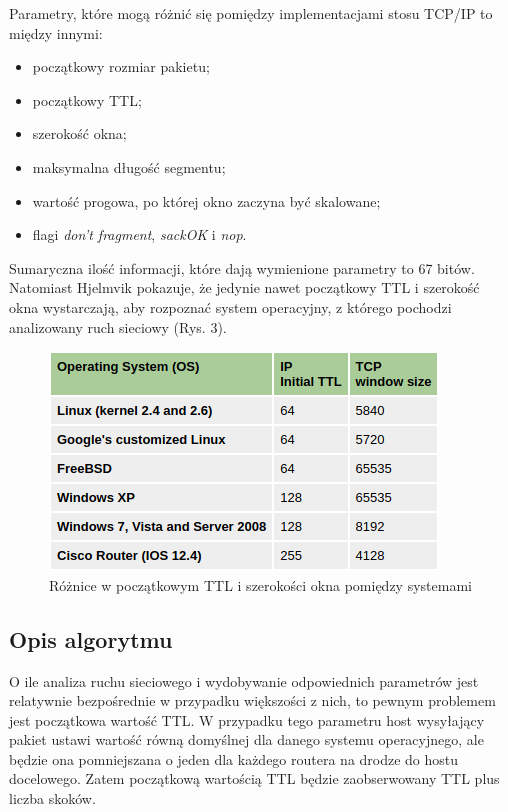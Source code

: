 
Parametry, które mogą różnić się pomiędzy implementacjami stosu TCP/IP to między
innymi:
\begin{itemize}
	\item początkowy rozmiar pakietu;
	\item początkowy TTL;
	\item szerokość okna;
	\item maksymalna długość segmentu;
	\item wartość progowa, po której okno zaczyna być skalowane;
	\item flagi \emph{don't fragment}, \emph{sackOK} i \emph{nop}.
\end{itemize}
Sumaryczna ilość informacji, które dają wymienione parametry to 67 bitów.
Natomiast Hjelmvik \cite{hjelmvik2011passive} pokazuje, że jedynie nawet
początkowy TTL i szerokość okna wystarczają, aby rozpoznać system operacyjny, z
którego pochodzi analizowany ruch sieciowy (Rys. 3).

\begin{figure}
	\includegraphics[width=\textwidth,keepaspectratio]{img/03}
	\caption{Różnice w początkowym TTL i szerokości okna pomiędzy systemami}
\end{figure}

\subsection{Opis algorytmu}
O ile analiza ruchu sieciowego i wydobywanie odpowiednich parametrów jest
relatywnie bezpośrednie w przypadku większości z nich, to pewnym problemem jest
początkowa wartość TTL. W przypadku tego parametru host wysyłający pakiet ustawi
wartość równą domyślnej dla danego systemu operacyjnego, ale będzie ona
pomniejszana o jeden dla każdego routera na drodze do hostu docelowego. Zatem
początkową wartością TTL będzie zaobserwowany TTL plus liczba skoków.


